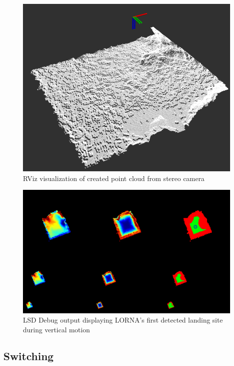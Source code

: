 \begin{figure}
    \centering
    \includegraphics[scale=0.45]{images/preparation/stereo/stereo_pointcloud.png}
    \caption{RViz visualization of created point cloud from stereo camera}
\end{figure}
\clearpage %

\begin{figure}
    \centering
    \includegraphics[scale=0.25]{images/preparation/stereo/lsd_ascent.png}
    \caption{LSD Debug output displaying LORNA's first detected landing site during vertical motion}
\end{figure}

\subsection{Switching}

